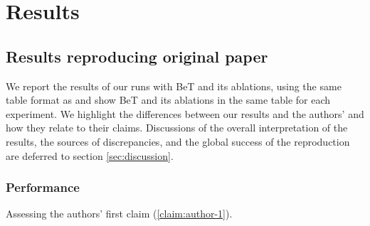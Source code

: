 \section{Results}\label{sec:results}

\subsection{Results reproducing original paper}
We report the results of our runs with BeT and its ablations, using the same table format as  \citet{shafiullah2022behavior} and show BeT and its ablations in the same table for each experiment.
We highlight the differences between our results and the authors' and how they relate to their claims.
Discussions of the overall interpretation of the results, the sources of discrepancies, and the global success of the reproduction are deferred to section \ref{sec:discussion}.

\subsubsection{Performance}\label{results:performance} Assessing the authors' first claim (\ref{claim:author-1}).\\

\begin{table}[htb]
\centering
\caption{Performance of BeT and its ablations on the Blockpush environment. Performance is measured by computing the probabilities of reaching one (R1) and two blocks (R2) and pushing one (P1) and two blocks (P2) to the respective target squares.
Best in bold.}
\label{tab:performance_blockpush}
\end{table}

